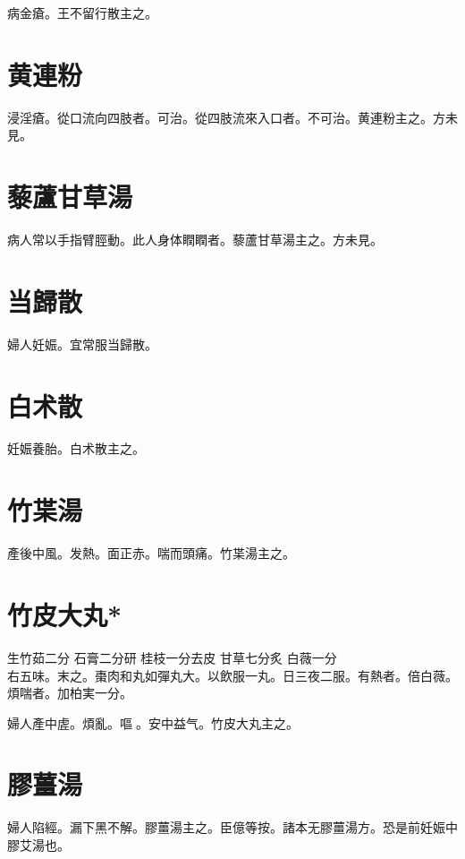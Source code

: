 病金瘡。王不留行散主之。

\section{黄連粉}

浸淫瘡。從口流向四肢者。可治。從四肢流來入口者。不可治。黄連粉主之。{\scriptsize 方未見。}

\section{藜蘆甘草湯}

病人常以手指臂脛動。此人身体瞤瞤者。藜蘆甘草湯主之。{\scriptsize 方未見。}

\section{当歸散}

婦人妊娠。宜常服当歸散。

\section{白术散}

妊娠養胎。白术散主之。

\section{竹枼湯}

產後中風。发熱。面{\khaaitp 正}赤。喘而頭痛。竹枼湯主之。

\section{竹皮大丸*}

生竹茹{\scriptsize 二分} 石膏{\scriptsize 二分研} 桂枝{\scriptsize 一分去皮} 甘草{\scriptsize 七分炙} 白薇{\scriptsize 一分}\\
右五味。末之。棗肉和丸如彈丸大。以飲服一丸。日三夜二服。有熱者。倍白薇。煩喘者。加柏実一分。

婦人產中虗。煩亂。嘔{\sungtpii 𠱘}。安中益气。竹皮大丸主之。

\section{膠薑湯}

婦人陷經。漏下黑不解。膠薑湯主之。{\scriptsize 臣億等按。諸本无膠薑湯{\khaaitp 方}。恐是前妊娠中膠艾湯也。}

